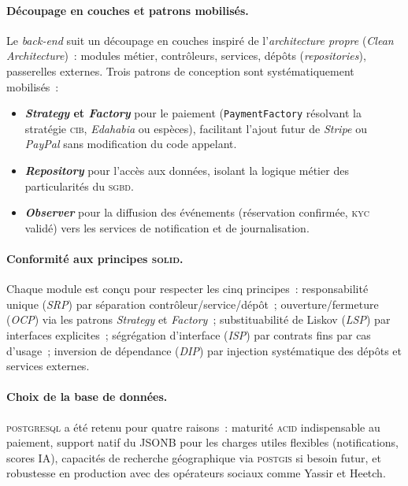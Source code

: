 \documentclass[12pt, a4paper, oneside]{report}
\begin{document}
\paragraph{Découpage en couches et patrons mobilisés.} Le \textit{back-end} suit un découpage en couches inspiré de l'\textit{architecture propre} (\textit{Clean Architecture})~: modules métier, contrôleurs, services, dépôts (\textit{repositories}), passerelles externes. Trois patrons de conception sont systématiquement mobilisés~:
\begin{itemize}
  \item \textbf{\textit{Strategy} et \textit{Factory}} pour le paiement (\texttt{PaymentFactory} résolvant la stratégie \textsc{cib}, \textit{Edahabia} ou espèces), facilitant l'ajout futur de \textit{Stripe} ou \textit{PayPal} sans modification du code appelant.
  \item \textbf{\textit{Repository}} pour l'accès aux données, isolant la logique métier des particularités du \textsc{sgbd}.
  \item \textbf{\textit{Observer}} pour la diffusion des événements (réservation confirmée, \textsc{kyc} validé) vers les services de notification et de journalisation.
\end{itemize}

\paragraph{Conformité aux principes \textsc{solid}.} Chaque module est conçu pour respecter les cinq principes~: responsabilité unique (\textit{SRP}) par séparation contrôleur/service/dépôt~; ouverture/fermeture (\textit{OCP}) via les patrons \textit{Strategy} et \textit{Factory}~; substituabilité de Liskov (\textit{LSP}) par interfaces explicites~; ségrégation d'interface (\textit{ISP}) par contrats fins par cas d'usage~; inversion de dépendance (\textit{DIP}) par injection systématique des dépôts et services externes.

\paragraph{Choix de la base de données.} \textsc{postgresql} a été retenu pour quatre raisons~: maturité \textsc{acid} indispensable au paiement, support natif du JSONB pour les charges utiles flexibles (notifications, scores IA), capacités de recherche géographique via \textsc{postgis} si besoin futur, et robustesse en production avec des opérateurs sociaux comme Yassir et Heetch.
\end{document}
